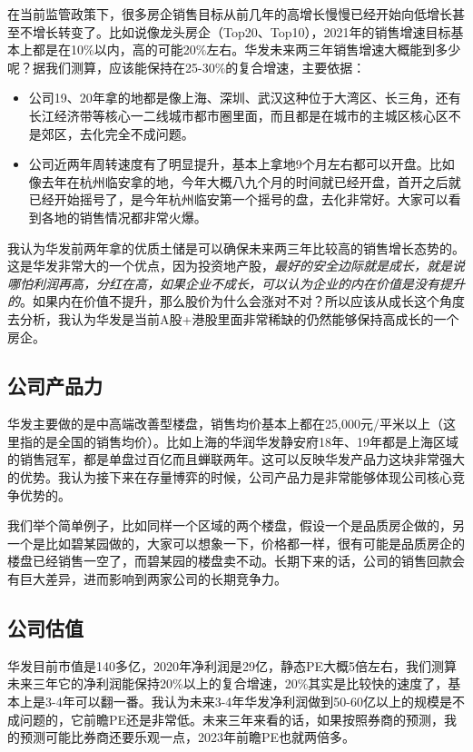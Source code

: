 \documentclass[a4paper,12pt,lang=cn,fontset = windows]{elegantpaper} %
\begin{document}
在当前监管政策下，很多房企销售目标从前几年的高增长慢慢已经开始向低增长甚至不增长转变了。比如说像龙头房企（Top20、Top10），2021年的销售增速目标基本上都是在10\%以内，高的可能20\%左右。华发未来两三年销售增速大概能到多少呢？据我们测算，应该能保持在25-30\%的复合增速，主要依据：
\begin{itemize}
    \item 公司19、20年拿的地都是像上海、深圳、武汉这种位于大湾区、长三角，还有长江经济带等核心一二线城市都市圈里面，而且都是在城市的主城区核心区不是郊区，去化完全不成问题。
    \item 公司近两年周转速度有了明显提升，基本上拿地9个月左右都可以开盘。比如像去年在杭州临安拿的地，今年大概八九个月的时间就已经开盘，首开之后就已经开始摇号了，是今年杭州临安第一个摇号的盘，去化非常好。大家可以看到各地的销售情况都非常火爆。
\end{itemize}

我认为华发前两年拿的优质土储是可以确保未来两三年比较高的销售增长态势的。这是华发非常大的一个优点，因为投资地产股，\emph{最好的安全边际就是成长，就是说哪怕利润再高，分红在高，如果企业不成长，可以认为企业的内在价值是没有提升的}。如果内在价值不提升，那么股价为什么会涨对不对？所以应该从成长这个角度去分析，我认为华发是当前A股+港股里面非常稀缺的仍然能够保持高成长的一个房企。



\subsection{公司产品力}

华发主要做的是中高端改善型楼盘，销售均价基本上都在25,000元/平米以上（这里指的是全国的销售均价）。比如上海的华润华发静安府18年、19年都是上海区域的销售冠军，都是单盘过百亿而且蝉联两年。这可以反映华发产品力这块非常强大的优势。我认为接下来在存量博弈的时候，公司产品力是非常能够体现公司核心竞争优势的。

我们举个简单例子，比如同样一个区域的两个楼盘，假设一个是品质房企做的，另一个是比如碧某园做的，大家可以想象一下，价格都一样，很有可能是品质房企的楼盘已经销售一空了，而碧某园的楼盘卖不动。长期下来的话，公司的销售回款会有巨大差异，进而影响到两家公司的长期竞争力。



\subsection{公司估值}

华发目前市值是140多亿，2020年净利润是29亿，静态PE大概5倍左右，我们测算未来三年它的净利润能保持20\%以上的复合增速，20\%其实是比较快的速度了，基本上是3-4年可以翻一番。我认为未来3-4年华发净利润做到50-60亿以上的规模是不成问题的，它前瞻PE还是非常低。未来三年来看的话，如果按照券商的预测，我的预测可能比券商还要乐观一点，2023年前瞻PE也就两倍多。
\end{document}
